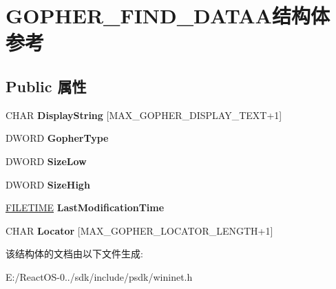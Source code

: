 \hypertarget{struct_g_o_p_h_e_r___f_i_n_d___d_a_t_a_a}{}\section{G\+O\+P\+H\+E\+R\+\_\+\+F\+I\+N\+D\+\_\+\+D\+A\+T\+A\+A结构体 参考}
\label{struct_g_o_p_h_e_r___f_i_n_d___d_a_t_a_a}
\subsection*{Public 属性}
\begin{DoxyCompactItemize}
\item 
\mbox{\label{struct_g_o_p_h_e_r___f_i_n_d___d_a_t_a_a_a3cca9cbeb6abf58ca641d7d889ca26d2}} 
C\+H\+AR {\bfseries Display\+String} \mbox{[}M\+A\+X\+\_\+\+G\+O\+P\+H\+E\+R\+\_\+\+D\+I\+S\+P\+L\+A\+Y\+\_\+\+T\+E\+XT+1\mbox{]}
\item 
\mbox{\label{struct_g_o_p_h_e_r___f_i_n_d___d_a_t_a_a_a61b5dbefc4f8fe1921579a38ea60e663}} 
D\+W\+O\+RD {\bfseries Gopher\+Type}
\item 
\mbox{\label{struct_g_o_p_h_e_r___f_i_n_d___d_a_t_a_a_a0946127da9204896b8df6fe43ca5f0ea}} 
D\+W\+O\+RD {\bfseries Size\+Low}
\item 
\mbox{\label{struct_g_o_p_h_e_r___f_i_n_d___d_a_t_a_a_ab5d07f8f3a67adb305d94f72abda35e1}} 
D\+W\+O\+RD {\bfseries Size\+High}
\item 
\mbox{\label{struct_g_o_p_h_e_r___f_i_n_d___d_a_t_a_a_a7c5ee2f19a127fe8e57b3d319a4f271f}} 
\hyperlink{struct___f_i_l_e_t_i_m_e}{F\+I\+L\+E\+T\+I\+ME} {\bfseries Last\+Modification\+Time}
\item 
\mbox{\label{struct_g_o_p_h_e_r___f_i_n_d___d_a_t_a_a_ab9e4039f46f102d68adec4a75d6f9419}} 
C\+H\+AR {\bfseries Locator} \mbox{[}M\+A\+X\+\_\+\+G\+O\+P\+H\+E\+R\+\_\+\+L\+O\+C\+A\+T\+O\+R\+\_\+\+L\+E\+N\+G\+TH+1\mbox{]}
\end{DoxyCompactItemize}


该结构体的文档由以下文件生成\+:\begin{DoxyCompactItemize}
\item 
E\+:/\+React\+O\+S-\/0../sdk/include/psdk/wininet.\+h\end{DoxyCompactItemize}
